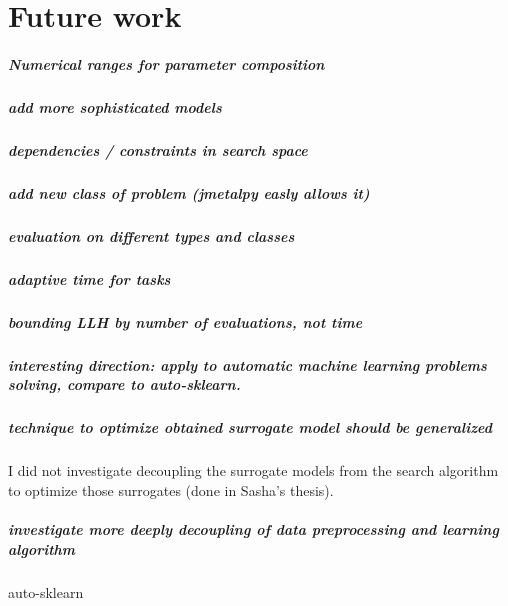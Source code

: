 \chapter{Future work}
\paragraph{Numerical ranges for parameter composition}
\paragraph{add more sophisticated models}
\paragraph{dependencies / constraints in search space}
\paragraph{add new class of problem (jmetalpy easly allows it)}
\paragraph{evaluation on different types and classes}
\paragraph{adaptive time for tasks}
\paragraph{bounding LLH by number of evaluations, not time}
\paragraph{interesting direction: apply to automatic machine learning problems solving, compare to auto-sklearn.}
\paragraph{technique to optimize obtained surrogate model should be generalized}
I did not investigate decoupling the surrogate models from the search algorithm to optimize those surrogates (done in Sasha's thesis).

\paragraph{investigate more deeply decoupling of data preprocessing and learning algorithm} auto-sklearn
